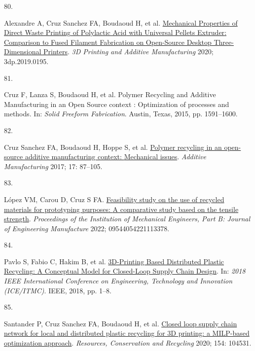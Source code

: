 \documentclass[
  12pt,
  a4paperpaper,
  onecolumn]{article}
\newlength{\cslhangindent}
\newlength{\csllabelwidth}
\newlength{\cslentryspacingunit} %
\newenvironment{CSLReferences}[2] %
 {%
  \setlength{\parindent}{0pt}
  \ifodd #1
  \let\oldpar\par
  \def\par{\hangindent=\cslhangindent\oldpar}
  \fi
  \setlength{\parskip}{#2\cslentryspacingunit}
 }%
 {}
\newcommand{\CSLLeftMargin}[1]{\parbox[t]{\csllabelwidth}{#1}}
\newcommand{\CSLRightInline}[1]{\parbox[t]{\linewidth - \csllabelwidth}{#1}\break}
\begin{document}
\begin{CSLReferences}{0}{0}
\leavevmode{}%
\CSLLeftMargin{80. }%
\CSLRightInline{Alexandre A, Cruz Sanchez FA, Boudaoud H, et al.
\href{https://doi.org/10.1089/3dp.2019.0195}{Mechanical {Properties} of
{Direct Waste Printing} of {Polylactic Acid} with {Universal Pellets
Extruder}: {Comparison} to {Fused Filament Fabrication} on {Open-Source
Desktop Three-Dimensional Printers}}. \emph{3D Printing and Additive
Manufacturing} 2020; 3dp.2019.0195.}

\leavevmode{}%
\CSLLeftMargin{81. }%
\CSLRightInline{Cruz F, Lanza S, Boudaoud H, et al. Polymer {Recycling}
and {Additive Manufacturing} in an {Open Source} context :
{Optimization} of processes and methods. In: \emph{Solid {Freeform
Fabrication}}. {Austin, Texas}, 2015, pp. 1591--1600.}

\leavevmode{}%
\CSLLeftMargin{82. }%
\CSLRightInline{Cruz Sanchez FA, Boudaoud H, Hoppe S, et al.
\href{https://doi.org/10.1016/j.addma.2017.05.013}{Polymer recycling in
an open-source additive manufacturing context: {Mechanical} issues}.
\emph{Additive Manufacturing} 2017; 17: 87--105.}

\leavevmode{}%
\CSLLeftMargin{83. }%
\CSLRightInline{López VM, Carou D, Cruz S FA.
\href{https://doi.org/10.1177/09544054221113378}{Feasibility study on
the use of recycled materials for prototyping purposes: {A} comparative
study based on the tensile strength}. \emph{Proceedings of the
Institution of Mechanical Engineers, Part B: Journal of Engineering
Manufacture} 2022; 09544054221113378.}

\leavevmode{}%
\CSLLeftMargin{84. }%
\CSLRightInline{Pavlo S, Fabio C, Hakim B, et al.
\href{https://doi.org/10.1109/ICE.2018.8436296}{{3D-Printing Based
Distributed Plastic Recycling}: {A Conceptual Model} for {Closed-Loop
Supply Chain Design}}. In: \emph{2018 {IEEE International Conference} on
{Engineering}, {Technology} and {Innovation} ({ICE}/{ITMC})}. {IEEE},
2018, pp. 1--8.}

\leavevmode{}%
\CSLLeftMargin{85. }%
\CSLRightInline{Santander P, Cruz Sanchez FA, Boudaoud H, et al.
\href{https://doi.org/10.1016/j.resconrec.2019.104531}{{Closed loop
supply chain network for local and distributed plastic recycling for 3D
printing: a MILP-based optimization approach}}. \emph{Resources,
Conservation and Recycling} 2020; 154: 104531.}


\end{CSLReferences}
\end{document}
